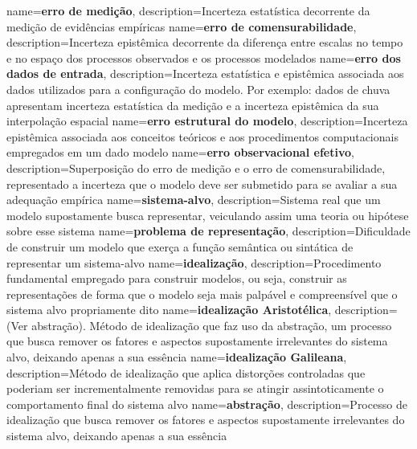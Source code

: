 {
    name=\textbf{erro de medição},
    description={Incerteza estatística decorrente da medição de evidências empíricas}
}
{
    name=\textbf{erro de comensurabilidade},
    description={Incerteza epistêmica decorrente da diferença entre escalas no tempo e no espaço dos processos observados e os processos modelados}
}
{
    name=\textbf{erro dos dados de entrada},
    description={Incerteza estatística e epistêmica associada aos dados utilizados para a configuração do modelo. Por exemplo: dados de chuva apresentam incerteza estatística da medição e a incerteza epistêmica da sua interpolação espacial}
}
{
    name=\textbf{erro estrutural do modelo},
    description={Incerteza epistêmica associada aos conceitos teóricos e aos procedimentos computacionais empregados em um dado modelo}
}
{
    name=\textbf{erro observacional efetivo},
    description={Superposição do erro de medição e o erro de comensurabilidade, representado a incerteza que o modelo deve ser submetido para se avaliar a sua adequação empírica}
}
{
    name=\textbf{sistema-alvo},
    description={Sistema real que um modelo supostamente busca representar, veiculando assim uma teoria ou hipótese sobre esse sistema}
}
{
    name=\textbf{problema de representação},
    description={Dificuldade de construir um modelo que exerça a função semântica ou sintática de representar um sistema-alvo}
}
{
    name=\textbf{idealização},
    description={Procedimento fundamental empregado para construir modelos, ou seja, construir as representações de forma que o modelo seja mais palpável e compreensível que o sistema alvo propriamente dito}
}
{
    name=\textbf{idealização Aristotélica},
    description={(Ver abstração). Método de idealização que faz uso da abstração, um processo que busca remover os fatores e aspectos supostamente irrelevantes do sistema alvo, deixando apenas a sua essência}
}
{
    name=\textbf{idealização Galileana},
    description={Método de idealização que aplica distorções controladas que poderiam ser incrementalmente removidas para se atingir assintoticamente o comportamento final do sistema alvo}
}
{
    name=\textbf{abstração},
    description={Processo de idealização que busca remover os fatores e aspectos supostamente irrelevantes do sistema alvo, deixando apenas a sua essência}
}
